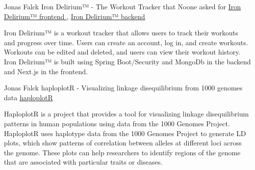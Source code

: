 

\begin{cventries}
\cventry
  {Jonas Falck}
  { Iron Delirium™ - The Workout Tracker that Noone asked for } %
  {
  \href{ https://github.com/joe-nas/workout-app-frontend-next }{ Iron Delirium™ frontend },
  \href{ https://github.com/joe-nas/workout-app }{ Iron Delirium™ backend }
  }
  {} %
  {    
  \begin{cvitems} %
    \item { Iron Delirium™ is a workout tracker that allows users to track their workouts and progress over time. Users can create an account, log in, and create workouts. Workouts can be edited and deleted, and users can view their workout history. Iron Delirium™ is built using Spring Boot/Security and MongoDb in the backend and Next.js in the frontend. }
  \end{cvitems}
  }
 \cventry
  {Jonas Falck}
  { haploplotR - Visualizing linkage disequilibrium from 1000 genomes data } %
  {
  \href{ https://github.com/joe-nas/haploplotR }{ haploplotR }
  }
  {} %
  {    
  \begin{cvitems} %
    \item { HaploplotR is a project that provides a tool for visualizing linkage disequilibrium patterns in human populations using data from the 1000 Genomes Project. HaploplotR uses haplotype data from the 1000 Genomes Project to generate LD plots, which show patterns of correlation between alleles at different loci across the genome. These plots can help researchers to identify regions of the genome that are associated with particular traits or diseases. }
  \end{cvitems}
  }
\end{cventries}